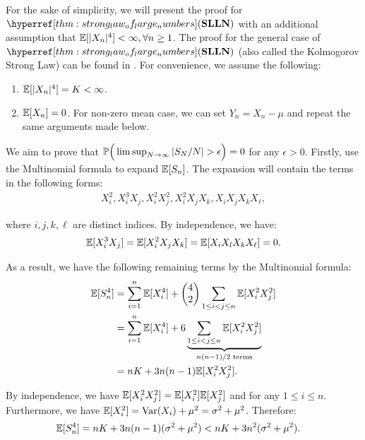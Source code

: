 \begin{proof*}
    For the sake of simplicity, we will present the proof for $\SLLN$ with an additional assumption that $\mathbb{E}[|X_n|^4] < \infty, \forall n \ge 1$. The proof for the general case of $\SLLN$ (also called the Kolmogorov Strong Law) can be found in \cite[Section 6, Theorem 6.1]{book:allen2004}. For convenience, we assume the following:
    \begin{enumerate}
        \item $\mathbb{E}[|X_n|^4] = K < \infty$.
        \item $\mathbb{E}[X_n] = 0$. For non-zero mean case, we can set $Y_n = X_n - \mu$ and repeat the same arguments made below.
    \end{enumerate}

    \noindent We aim to prove that $\Pm\bigRound{\limsup_{N\to\infty}|S_N/N|>\epsilon} = 0$ for any $\epsilon>0$. Firstly, use the Multinomial formula to expand $\mathbb{E}[S_n]$. The expansion will contain the terms in the following forms:
    \begin{align*}
        X_i^2, X_i^3 X_j, X_i^2X_j^2, X_i^2X_jX_k, X_iX_jX_kX_\ell,
    \end{align*}

    \noindent where $i, j, k, \ell$ are distinct indices. By independence, we have:
    \begin{align*}
        \mathbb{E}[X_i^3X_j] = \mathbb{E}[X_i^2X_jX_k] = \mathbb{E}[X_iX_lX_kX_\ell] = 0.
    \end{align*}

    \noindent As a result, we have the following remaining terms by the Multinomial formula:
    \begin{align*}
        \mathbb{E}[S_n^4] &= \sum_{i=1}^n \mathbb{E}[X_i^4] + \begin{pmatrix}
            4 \\ 2
        \end{pmatrix}\sum_{1 \le i < j \le n}\mathbb{E}[X_i^2X_j^2] \\
        &= \sum_{i=1}^n \mathbb{E}[X_i^4] + 6 \underbrace{\sum_{1 \le i < j \le n}\mathbb{E}[X_i^2X_j^2]}_{n(n-1)/2 \text{ terms}} \\
        &= nK + 3n(n-1)\mathbb{E}[X_i^2X_j^2].
    \end{align*}

    \noindent By independence, we have $\mathbb{E}[X_i^2X_j^2]=\mathbb{E}[X_i^2]\mathbb{E}[X_j^2]$ and for any $1\le i \le n$. Furthermore, we have $\mathbb{E}[X_i^2] = \mathrm{Var}(X_i) + \mu^2 = \sigma^2 + \mu^2$. Therefore:
    \begin{align*}
        \mathbb{E}[S_n^4] &= nK + 3n(n-1)(\sigma^2 + \mu^2) < nK + 3n^2(\sigma^2 + \mu^2).
    \end{align*}


\end{proof*}
